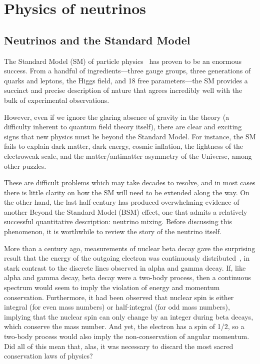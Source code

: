 \documentclass[../thesis.tex]{subfiles}
\begin{document}
\chapter{Physics of neutrinos}
\label{chap:intro}

\section{Neutrinos and the Standard Model}
\label{sec:neuAndSM}

The Standard Model (SM) of particle physics~\cite{Rosner_2001zy} has proven to be an enormous success. From a handful of ingredients---three gauge groups, three generations of quarks and leptons, the Higgs field, and 18 free parameters---the SM provides a succinct and precise description of nature that agrees incredibly well with the bulk of experimental observations.

However, even if we ignore the glaring absence of gravity in the theory (a difficulty inherent to quantum field theory itself), there are clear and exciting signs that new physics must lie beyond the Standard Model. For instance, the SM fails to explain dark matter, dark energy, cosmic inflation, the lightness of the electroweak scale, and the matter/antimatter asymmetry of the Universe, among other puzzles.

These are difficult problems which may take decades to resolve, and in most cases there is little clarity on how the SM will need to be extended along the way. On the other hand, the last half-century has produced overwhelming evidence of another Beyond the Standard Model (BSM) effect, one that admits a relatively successful quantitative description: neutrino mixing. Before discussing this phenomenon, it is worthwhile to review the story of the neutrino itself.

More than a century ago, measurements of nuclear beta decay gave the surprising result that the energy of the outgoing electron was continuously distributed~\cite{Chadwick:262756}, in stark contrast to the discrete lines observed in alpha and gamma decay. If, like alpha and gamma decay, beta decay were a two-body process, then a continuous spectrum would seem to imply the violation of energy and momentum conservation. Furthermore, it had been observed that nuclear spin is either integral (for even mass numbers) or half-integral (for odd mass numbers), implying that the nuclear spin can only change by an integer during beta decays, which conserve the mass number. And yet, the electron has a spin of 1/2, so a two-body process would also imply the non-conservation of angular momentum. Did all of this mean that, alas, it was necessary to discard the most sacred conservation laws of physics?
\end{document}
